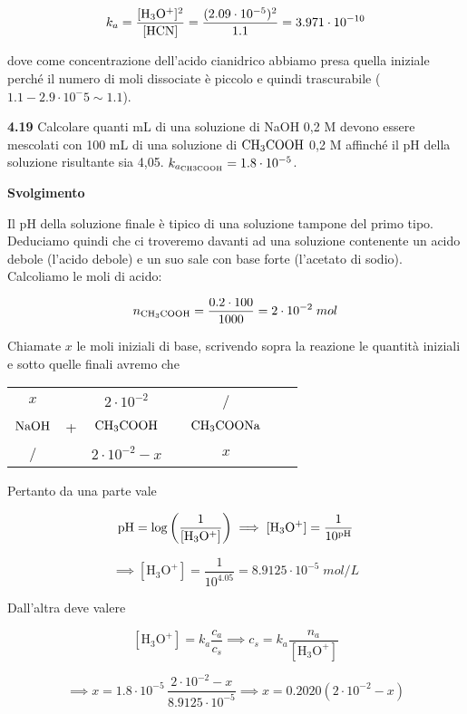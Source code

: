 $$k_a=\rm \frac{[H_3O^+]^2}{[HCN]}=\frac{(2.09 \cdot 10^{-5})^2}{1.1}=3.971 \cdot 10^{-10}$$

dove come concentrazione dell'acido cianidrico abbiamo presa quella iniziale perché il numero di moli dissociate è piccolo e quindi trascurabile ($1.1 - 2.9 \cdot 10^-5 \sim 1.1$).

\vspace{0.2cm}\textbf{4.19}  Calcolare quanti mL di una soluzione di NaOH 0,2 M devono essere mescolati con
100 mL di una soluzione di $\rm CH_3COOH$ 0,2 M affinché il pH della soluzione risultante sia 4,05. $k_{a_{\rm CH3COOH}}=1.8 \cdot 10^{-5}$.

\vspace{0.2cm}\large\textbf{Svolgimento}\normalsize

\vspace{0.2cm}Il pH della soluzione finale è tipico di una soluzione tampone del primo tipo. Deduciamo quindi che ci troveremo davanti ad una soluzione contenente un acido debole (l'acido debole) e un suo sale con base forte (l'acetato di sodio). Calcoliamo le moli di acido:

$$n_{\rm CH_3COOH}=\frac{0.2 \cdot 100}{1000}=2 \cdot 10^{-2}\;mol$$

Chiamate $x$ le moli iniziali di base, scrivendo sopra la reazione le quantità iniziali e sotto quelle finali avremo che

\begin{center}
    \begin{tabular}{ccccccc}
        $x$ & & $2 \cdot 10^{-2}$ & & /\\
        $\rm NaOH$ & + & $\rm CH_3COOH$ & \ce{<-->} & $\rm CH_3COONa$\\
        / & & $2 \cdot 10^{-2} - x$ & & $x$\\
    \end{tabular}
\end{center}


Pertanto da una parte vale

$$\rm pH=\log{\left(\frac{1}{[H_3O^+]}\right)}
\implies
[H_3O^+]=\frac{1}{10^{pH}}$$

$$\implies
[\text{H}_3\text{O}^+]=\frac{1}{10^{4.05}}=8.9125 \cdot 10^{-5}\;mol/L$$

Dall'altra deve valere

$$[\text{H}_3\text{O}^+]=k_a\frac{c_a}{c_s}
\implies
c_s=k_a\frac{n_a}{[\text{H}_3\text{O}^+]}$$

$$\implies
x=1.8 \cdot 10^{-5}\,\frac{2 \cdot 10^{-2} - x}{8.9125 \cdot 10^{-5}}
\implies
x=0.2020(2 \cdot 10^{-2} - x)$$

